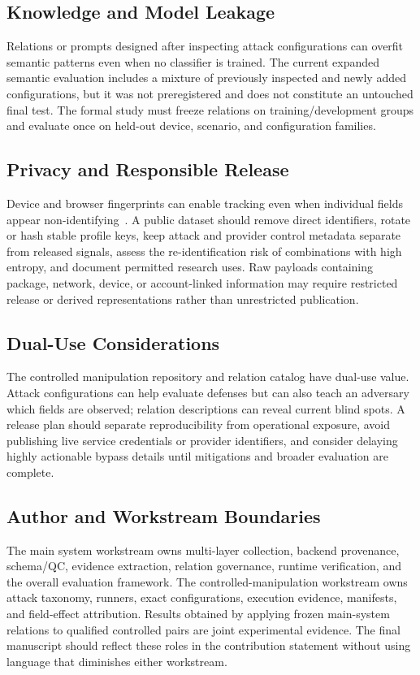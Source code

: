 \subsection{Knowledge and Model Leakage}

Relations or prompts designed after inspecting attack configurations can overfit semantic patterns even when no classifier is trained. The current expanded semantic evaluation includes a mixture of previously inspected and newly added configurations, but it was not preregistered and does not constitute an untouched final test. The formal study must freeze relations on training/development groups and evaluate once on held-out device, scenario, and configuration families.

\subsection{Privacy and Responsible Release}

Device and browser fingerprints can enable tracking even when individual fields appear non-identifying~\cite{laperdrix2020browser,w3c2025fingerprinting}. A public dataset should remove direct identifiers, rotate or hash stable profile keys, keep attack and provider control metadata separate from released signals, assess the re-identification risk of combinations with high entropy, and document permitted research uses. Raw payloads containing package, network, device, or account-linked information may require restricted release or derived representations rather than unrestricted publication.

\subsection{Dual-Use Considerations}

The controlled manipulation repository and relation catalog have dual-use value. Attack configurations can help evaluate defenses but can also teach an adversary which fields are observed; relation descriptions can reveal current blind spots. A release plan should separate reproducibility from operational exposure, avoid publishing live service credentials or provider identifiers, and consider delaying highly actionable bypass details until mitigations and broader evaluation are complete.

\subsection{Author and Workstream Boundaries}

The main system workstream owns multi-layer collection, backend provenance, schema/QC, evidence extraction, relation governance, runtime verification, and the overall evaluation framework. The controlled-manipulation workstream owns attack taxonomy, runners, exact configurations, execution evidence, manifests, and field-effect attribution. Results obtained by applying frozen main-system relations to qualified controlled pairs are joint experimental evidence. The final manuscript should reflect these roles in the contribution statement without using language that diminishes either workstream.
